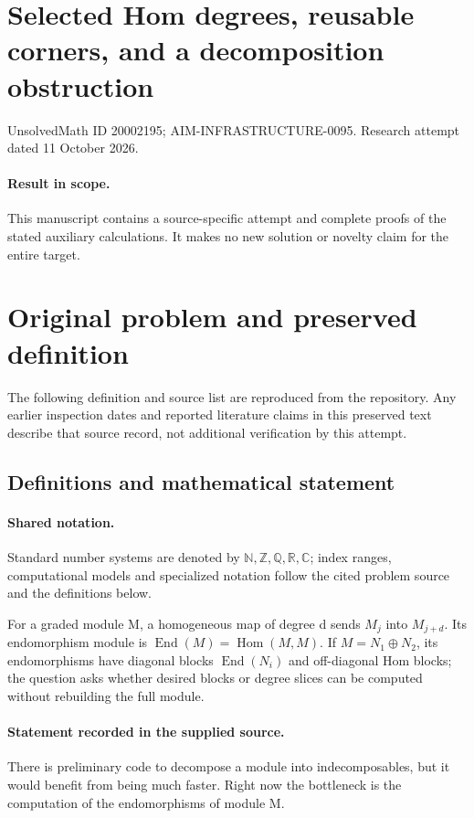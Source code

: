 \documentclass[11pt]{article}
\begin{document}
\section*{Selected Hom degrees, reusable corners, and a decomposition obstruction}
\noindent UnsolvedMath ID 20002195; AIM-INFRASTRUCTURE-0095. Research attempt dated 11 October 2026.
\paragraph{Result in scope.}This manuscript contains a source-specific attempt and complete proofs of the stated auxiliary calculations. It makes no new solution or novelty claim for the entire target.
\section{Original problem and preserved definition}
The following definition and source list are reproduced from the repository. Any earlier inspection dates and reported literature claims in this preserved text describe that source record, not additional verification by this attempt.
\subsection{Definitions and mathematical statement}

\paragraph{Shared notation.}Standard number systems are denoted by $\mathbb N,\mathbb Z,\mathbb Q,\mathbb R,\mathbb C$; index ranges, computational models and specialized notation follow the cited problem source and the definitions below.


For a graded module M, a homogeneous map of degree d sends $M_j$ into $M_{j+d}$. Its endomorphism module is $\operatorname{End}(M)=\operatorname{Hom}(M,M)$. If $M=N_1\oplus N_2$, its endomorphisms have diagonal blocks $\operatorname{End}(N_i)$ and off-diagonal Hom blocks; the question asks whether desired blocks or degree slices can be computed without rebuilding the full module.
\paragraph{Statement recorded in the supplied source.}
There is preliminary code to decompose a module into indecomposables, but it would benefit from being much faster. Right now the bottleneck is the computation of the endomorphisms of module M.
\end{document}
